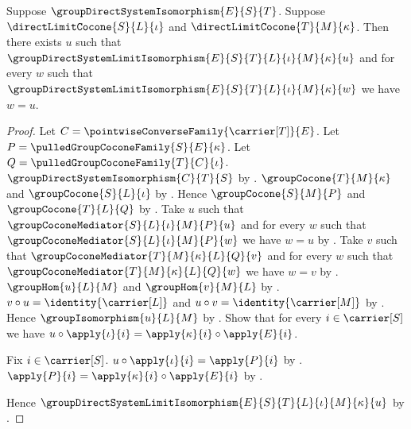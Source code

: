 \begin{theorem}\label{group_direct_system_limit_isomorphism_exists_unique}
    Suppose $\groupDirectSystemIsomorphism{E}{S}{T}$.
    Suppose $\directLimitCocone{S}{L}{\iota}$ and
        $\directLimitCocone{T}{M}{\kappa}$.
    Then there exists $u$ such that
        $\groupDirectSystemLimitIsomorphism
            {E}{S}{T}{L}{\iota}{M}{\kappa}{u}$ and
        for every $w$ such that
            $\groupDirectSystemLimitIsomorphism
                {E}{S}{T}{L}{\iota}{M}{\kappa}{w}$
        we have $w=u$.
\end{theorem}
\begin{proof}
    Let $C=\pointwiseConverseFamily{\carrier[T]}{E}$.
    Let $P=\pulledGroupCoconeFamily{S}{E}{\kappa}$.
    Let $Q=\pulledGroupCoconeFamily{T}{C}{\iota}$.
    $\groupDirectSystemIsomorphism{C}{T}{S}$ by
        .
    $\groupCocone{T}{M}{\kappa}$ and
        $\groupCocone{S}{L}{\iota}$ by
        .
    Hence $\groupCocone{S}{M}{P}$ and
        $\groupCocone{T}{L}{Q}$ by
        .
    Take $u$ such that
        $\groupCoconeMediator{S}{L}{\iota}{M}{P}{u}$ and
        for every $w$ such that
            $\groupCoconeMediator{S}{L}{\iota}{M}{P}{w}$
        we have $w=u$ by
        .
    Take $v$ such that
        $\groupCoconeMediator{T}{M}{\kappa}{L}{Q}{v}$ and
        for every $w$ such that
            $\groupCoconeMediator{T}{M}{\kappa}{L}{Q}{w}$
        we have $w=v$ by
        .
    $\groupHom{u}{L}{M}$ and $\groupHom{v}{M}{L}$ by
        .
    $v\circ u=\identity{\carrier[L]}$ and
        $u\circ v=\identity{\carrier[M]}$ by
        .
    Hence $\groupIsomorphism{u}{L}{M}$ by
        .
    Show that for every $i\in\carrier[S]$ we have
        $u\circ\apply{\iota}{i}
            =\apply{\kappa}{i}\circ\apply{E}{i}$.
    \begin{subproof}
        Fix $i\in\carrier[S]$.
        $u\circ\apply{\iota}{i}=\apply{P}{i}$ by
            .
        $\apply{P}{i}=\apply{\kappa}{i}\circ\apply{E}{i}$ by
            .
    \end{subproof}
    Hence $\groupDirectSystemLimitIsomorphism
        {E}{S}{T}{L}{\iota}{M}{\kappa}{u}$ by
        .

\end{proof}
